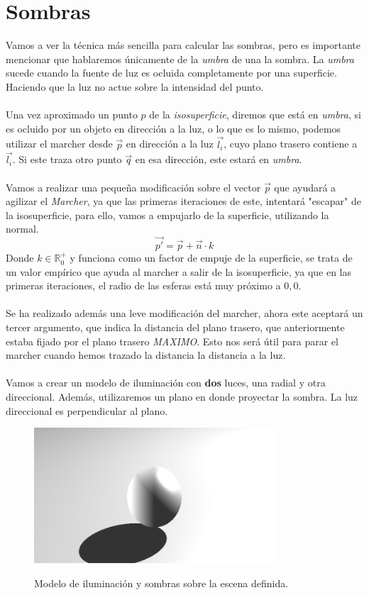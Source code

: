 \section{Sombras}
Vamos a ver la técnica más sencilla para calcular las sombras, pero es importante mencionar que hablaremos únicamente de la \textit{umbra} de una la sombra. La \textit{umbra} sucede cuando la fuente de luz es ocluida completamente por una superficie. Haciendo que la luz no actue sobre la intensidad del punto.\\\\Una vez aproximado un punto \(p\) de la \textit{isosuperficie}, diremos que está en \textit{umbra}, si es ocluido por un objeto en dirección a la luz, o lo que es lo mismo, podemos utilizar el marcher desde \(\Vec{p}\) en dirección a la luz \(\Vec{l_i}\), cuyo plano trasero contiene a \(\Vec{l_i}\). Si este traza otro punto \(\Vec{q}\) en esa dirección, este estará en \textit{umbra}.\\\\
Vamos a realizar una pequeña modificación sobre el vector \(\Vec{p}\) que ayudará a agilizar el \textit{Marcher}, ya que las primeras iteraciones de este, intentará "escapar" de la isosuperficie, para ello, vamos a empujarlo de la superficie, utilizando la normal.
\[\Vec{p'}=\Vec{p} + \Vec{n} \cdot k\]
Donde \(k\in\mathbb{R}^{+}_{0}\) y funciona como un factor de empuje de la superficie, se trata de un valor empírico que ayuda al marcher a salir de la isosuperficie, ya que en las primeras iteraciones, el radio de las esferas está muy próximo a \(0,0\). \\\\
Se ha realizado además una leve modificación del marcher, ahora este aceptará un tercer argumento, que indica la distancia del plano trasero, que anteriormente estaba fijado por el plano trasero \textit{MAXIMO}. Esto nos será útil para parar el marcher cuando hemos trazado la distancia la distancia a la luz.\\\\
Vamos a crear un modelo de iluminación con \textbf{dos} luces, una radial y otra direccional. Además, utilizaremos un plano en donde proyectar la sombra. La luz direccional es perpendicular al plano.
\begin{figure}[H]
  \centering
  \captionsetup{justification=centering}%
  \includegraphics[width=0.8\textwidth]{secciones/imagenes/lightmodel/sombra_dura.png}\label{fig:shadow}
  \caption{Modelo de iluminación y sombras sobre la escena definida.}
\end{figure}
